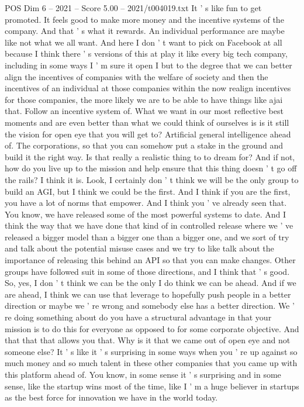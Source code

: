 \begin{textsample}{POS Dim 6 – 2021 – Score 5.00 – 2021/t004019.txt}
It ' s like fun to get promoted.
It feels good to make more money and the incentive systems of the company.
And that ' s what it rewards.
An individual performance are maybe like not what we all want.
And here I don ' t want to pick on Facebook at all because I think there ' s versions of this at play it like every big tech company, including in some ways I ' m sure it open I but to the degree that we can better align the incentives of companies with the welfare of society and then the incentives of an individual at those companies within the now realign incentives for those companies, the more likely we are to be able to have things like ajai that.
Follow an incentive system of.
What we want in our most reflective best moments and are even better than what we could think of ourselves is is it still the vision for open eye that you will get to?
Artificial general intelligence ahead of.
The corporations, so that you can somehow put a stake in the ground and build it the right way.
Is that really a realistic thing to to dream for?
And if not, how do you live up to the mission and help ensure that this thing doesn ' t go off the rails?
I think it is.
Look, I certainly don ' t think we will be the only group to build an AGI, but I think we could be the first.
And I think if you are the first, you have a lot of norms that empower.
And I think you ' ve already seen that.
You know, we have released some of the most powerful systems to date.
And I think the way that we have done that kind of in controlled release where we ' ve released a bigger model than a bigger one than a bigger one, and we sort of try and talk about the potential misuse cases and we try to like talk about the importance of releasing this behind an API so that you can make changes.
Other groups have followed suit in some of those directions, and I think that ' s good.
So, yes, I don ' t think we can be the only I do think we can be ahead.
And if we are ahead, I think we can use that leverage to hopefully push people in a better direction or maybe we ' re wrong and somebody else has a better direction.
We ' re doing something about do you have a structural advantage in that your mission is to do this for everyone as opposed to for some corporate objective.
And that that that allows you that.
Why is it that we came out of open eye and not someone else?
It ' s like it ' s surprising in some ways when you ' re up against so much money and so much talent in these other companies that you came up with this platform ahead of.
You know, in some sense it ' s surprising and in some sense, like the startup wins most of the time, like I ' m a huge believer in startups as the best force for innovation we have in the world today.

\end{textsample}
